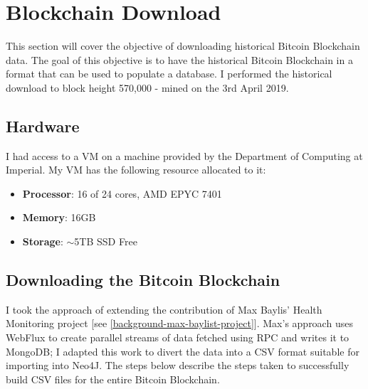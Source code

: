 \section{Blockchain Download}\label{section-blockchain-download}
This section will cover the objective of downloading historical Bitcoin Blockchain data. The goal of this objective is to have the historical Bitcoin Blockchain in a format that can be used to populate a database. I performed the historical download to block height 570,000 - mined on the 3rd April 2019. 

\subsection{Hardware}\label{satoshi-specs}
I had access to a VM on a machine provided by the Department of Computing at Imperial.  My VM has the following resource allocated to it:
\begin{itemize}
    \item \textbf{Processor}: 16 of 24 cores, AMD EPYC 7401
    \item \textbf{Memory}: 16GB
    \item \textbf{Storage}: $\sim$5TB SSD Free
\end{itemize}

\subsection{Downloading the Bitcoin Blockchain}
I took the approach of extending the contribution of Max Baylis' Health Monitoring project [see \ref{background-max-baylist-project}]. Max's approach uses WebFlux to create parallel streams of data fetched using RPC and writes it to MongoDB; I adapted this work to divert the data into a CSV format suitable for importing into Neo4J. The steps below describe the steps taken to successfully build CSV files for the entire Bitcoin Blockchain. 

